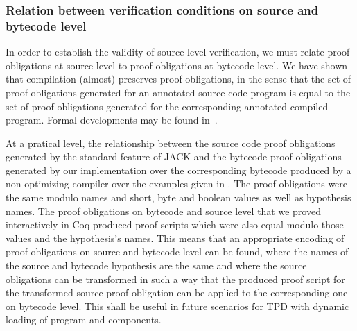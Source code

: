  \subsubsection{Relation between verification conditions on source and
 bytecode level } \label{pogEquiv} 

In order to establish the validity of source level verification, we
must relate proof obligations at source level to proof obligations at
bytecode level. We have shown that compilation (almost) preserves
proof obligations, in the sense that the set of proof obligations
generated for an annotated source code program is equal to the set of
proof obligations generated for the corresponding annotated compiled
program. Formal developments may be found
in~\cite{gta05:fast,BP06:sac}.


At a pratical level, the relationship between the source code proof
obligations generated by the standard feature of JACK and the bytecode
proof obligations generated by our implementation over the
corresponding bytecode produced by a non optimizing compiler over the
examples given in \cite{JPVC03JKM}. The proof obligations were the
same modulo names and short, byte and boolean values as well as
hypothesis names. The proof obligations on bytecode and source level
that we proved interactively in Coq produced proof scripts which were
also equal modulo those values and the hypothesis's names. This means
that an appropriate encoding of proof obligations on source and
bytecode level can be found, where the names of the source and
bytecode hypothesis are the same and where the source obligations can
be transformed in such a way that the produced proof script for the
transformed source proof obligation can be applied to the
corresponding one on bytecode level. This shall be useful in future
scenarios for TPD with dynamic loading of program and components.






